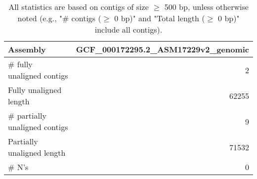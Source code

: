\documentclass[12pt,a4paper]{article}
\begin{document}
\begin{table}[ht]
\begin{center}
\caption{All statistics are based on contigs of size $\geq$ 500 bp, unless otherwise noted (e.g., "\# contigs ($\geq$ 0 bp)" and "Total length ($\geq$ 0 bp)" include all contigs).}
\begin{tabular}{|l*{1}{|r}|}
\hline
Assembly & GCF\_000172295.2\_ASM17229v2\_genomic \\ \hline
\# fully unaligned contigs & 2 \\ \hline
Fully unaligned length & 62255 \\ \hline
\# partially unaligned contigs & 9 \\ \hline
Partially unaligned length & 71532 \\ \hline
\# N's & 0 \\ \hline
\end{tabular}
\end{center}
\end{table}
\end{document}
